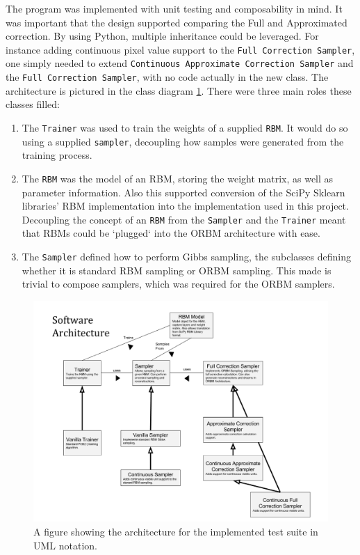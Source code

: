 The program was implemented with unit testing and composability in mind. It was important that the design supported comparing the Full and Approximated correction. By using Python, multiple inheritance could be leveraged. For instance  adding continuous pixel value support to the \texttt{Full Correction Sampler}, one simply needed to extend \texttt{Continuous Approximate Correction Sampler} and the  \texttt{Full Correction Sampler}, with no code actually in the new class. The architecture is pictured in the class diagram \ref{F:Prog-Arch}. There were three main roles these classes filled:
\begin{enumerate}
  \item The \texttt{Trainer} was used to train the weights of a supplied \texttt{RBM}. It would do so using a supplied \texttt{sampler}, decoupling how samples were generated from the training process.
  \item The \texttt{RBM} was the model of an RBM, storing the weight matrix, as well as parameter information. Also this supported conversion of the SciPy Sklearn libraries' RBM implementation into the implementation used in this project. Decoupling the concept of an \texttt{RBM} from the \texttt{Sampler} and the \texttt{Trainer} meant that RBMs could be `plugged` into the ORBM architecture with ease.
  \item The \texttt{Sampler} defined how to perform Gibbs sampling, the subclasses defining whether it is standard RBM sampling or ORBM sampling. This made is trivial to compose samplers, which was required for the ORBM samplers.
\end{enumerate}

\begin{figure}[h]
\begin{center}
  \includegraphics[width = 1\textwidth]{Assets/ENGR489-Architecture.png}
\caption{A figure showing the architecture for the implemented test suite in UML notation.}
\label{F:Prog-Arch}
\end{center}
\end{figure}


